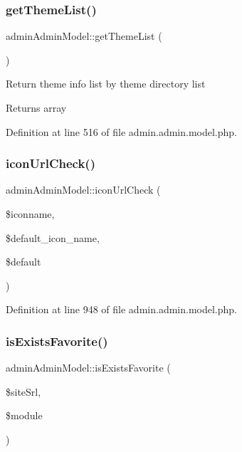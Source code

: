 \hypertarget{classadminAdminModel_a2a331c8f7fea9c12f56f5f5f75a3960c}{}\label{classadminAdminModel_a2a331c8f7fea9c12f56f5f5f75a3960c} 
\subsubsection{\texorpdfstring{get\+Theme\+List()}{getThemeList()}}
{\footnotesize\ttfamily admin\+Admin\+Model\+::get\+Theme\+List (\begin{DoxyParamCaption}{ }\end{DoxyParamCaption})}

Return theme info list by theme directory list \begin{DoxyReturn}{Returns}
array 
\end{DoxyReturn}


Definition at line 516 of file admin.\+admin.\+model.\+php.

\hypertarget{classadminAdminModel_ab77b7dd452e81ca285debe37a159e0d7}{}\label{classadminAdminModel_ab77b7dd452e81ca285debe37a159e0d7} 
\subsubsection{\texorpdfstring{icon\+Url\+Check()}{iconUrlCheck()}}
{\footnotesize\ttfamily admin\+Admin\+Model\+::icon\+Url\+Check (\begin{DoxyParamCaption}\item[{}]{\$iconname,  }\item[{}]{\$default\+\_\+icon\+\_\+name,  }\item[{}]{\$default }\end{DoxyParamCaption})}



Definition at line 948 of file admin.\+admin.\+model.\+php.

\hypertarget{classadminAdminModel_a6ba3dfaa5f5f1cc41284676b9e0b7b9d}{}\label{classadminAdminModel_a6ba3dfaa5f5f1cc41284676b9e0b7b9d} 
\subsubsection{\texorpdfstring{is\+Exists\+Favorite()}{isExistsFavorite()}}
{\footnotesize\ttfamily admin\+Admin\+Model\+::is\+Exists\+Favorite (\begin{DoxyParamCaption}\item[{}]{\$site\+Srl,  }\item[{}]{\$module }\end{DoxyParamCaption})}

